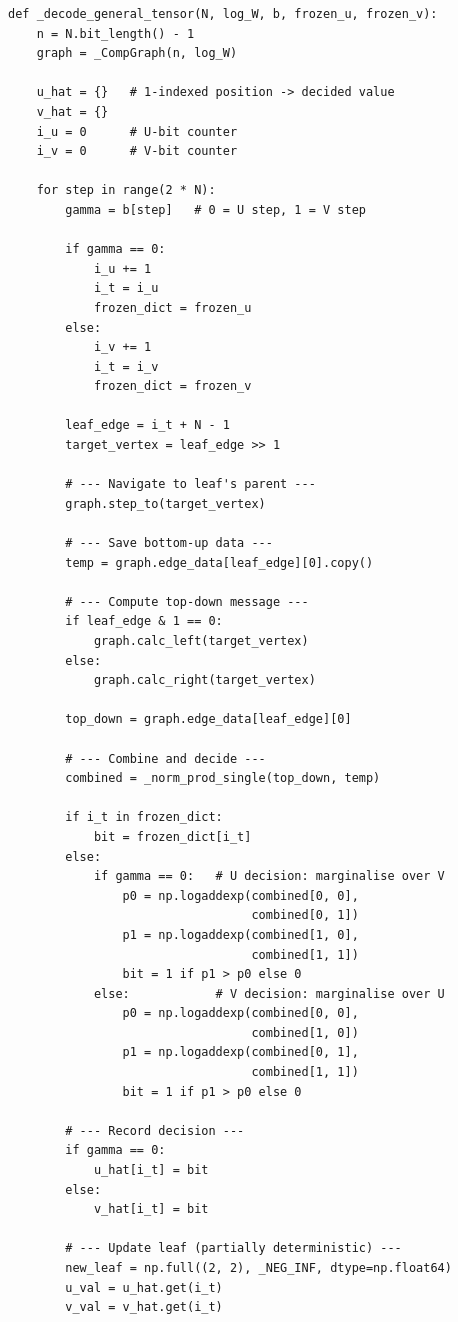 \documentclass[11pt,a4paper]{article}
\begin{document}
\begin{lstlisting}[caption={Main decoder loop (\texttt{\_decode\_general\_tensor})},label=lst:main_loop]
def _decode_general_tensor(N, log_W, b, frozen_u, frozen_v):
    n = N.bit_length() - 1
    graph = _CompGraph(n, log_W)

    u_hat = {}   # 1-indexed position -> decided value
    v_hat = {}
    i_u = 0      # U-bit counter
    i_v = 0      # V-bit counter

    for step in range(2 * N):
        gamma = b[step]   # 0 = U step, 1 = V step

        if gamma == 0:
            i_u += 1
            i_t = i_u
            frozen_dict = frozen_u
        else:
            i_v += 1
            i_t = i_v
            frozen_dict = frozen_v

        leaf_edge = i_t + N - 1
        target_vertex = leaf_edge >> 1

        # --- Navigate to leaf's parent ---
        graph.step_to(target_vertex)

        # --- Save bottom-up data ---
        temp = graph.edge_data[leaf_edge][0].copy()

        # --- Compute top-down message ---
        if leaf_edge & 1 == 0:
            graph.calc_left(target_vertex)
        else:
            graph.calc_right(target_vertex)

        top_down = graph.edge_data[leaf_edge][0]

        # --- Combine and decide ---
        combined = _norm_prod_single(top_down, temp)

        if i_t in frozen_dict:
            bit = frozen_dict[i_t]
        else:
            if gamma == 0:   # U decision: marginalise over V
                p0 = np.logaddexp(combined[0, 0],
                                  combined[0, 1])
                p1 = np.logaddexp(combined[1, 0],
                                  combined[1, 1])
                bit = 1 if p1 > p0 else 0
            else:            # V decision: marginalise over U
                p0 = np.logaddexp(combined[0, 0],
                                  combined[1, 0])
                p1 = np.logaddexp(combined[0, 1],
                                  combined[1, 1])
                bit = 1 if p1 > p0 else 0

        # --- Record decision ---
        if gamma == 0:
            u_hat[i_t] = bit
        else:
            v_hat[i_t] = bit

        # --- Update leaf (partially deterministic) ---
        new_leaf = np.full((2, 2), _NEG_INF, dtype=np.float64)
        u_val = u_hat.get(i_t)
        v_val = v_hat.get(i_t)


\end{lstlisting}
\end{document}
